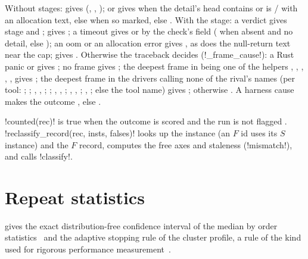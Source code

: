 \begin{algorithm}\label{alg:bench-rival-cause}
Without stages:  gives (, , );
 or  gives  when the detail's head contains
 or is / with an allocation text, else
 when so marked, else . With the 
stage: a verdict gives stage  and ;  gives
; a timeout gives  or 
by the check's  field ( when absent and no detail, else ); an
oom or an allocation error gives , as does the null-return text near the cap;
 gives . Otherwise the
traceback decides (\py!_frame_cause!): a Rust panic or  gives
; no frame gives ; the deepest frame in
 being one of the helpers , , ,
, ,  gives ; the deepest
frame in the drivers calling none of the rival's names (per tool: ; ;
, , ; ; ,
, ; , ,
; , ; else the tool name) gives
; otherwise . A harness cause makes the outcome
, else .
\end{algorithm}

\py!counted(rec)! is true when the outcome is scored and the run is not flagged
. \py!reclassify_record(rec, insts, falses)! looks up the instance (an $F$
id uses its $S$ instance) and the $F$ record, computes the free axes and staleness
(\py!mismatch!), and calls \py!classify!.

\section{Repeat statistics}\label{sec:bench-stats}

 gives the exact distribution-free confidence interval of the median
by order statistics~\cite{david2003order} and the adaptive stopping rule of the cluster
profile, a rule of the kind used for rigorous performance measurement~\cite{georges2007statistically}.

